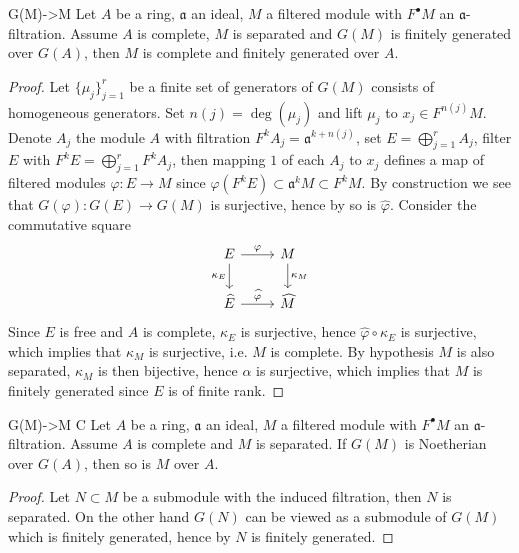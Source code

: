 \documentclass[10pt]{extarticle}
\begin{document}
\begin{proposition}{}{G(M)->M}
    Let $A$ be a ring, $\mathfrak{a}$ an ideal, $M$ a filtered module with $F^\bullet M$ an $\mathfrak{a}$-filtration. Assume $A$ is complete, $M$ is separated and $G(M)$ is finitely generated over $G(A)$, then $M$ is complete and finitely generated over $A$.
\end{proposition}
\begin{proof}
    Let $\{\mu_j\}_{j=1}^r$ be a finite set of generators of $G(M)$ consists of homogeneous generators. Set $n(j)=\deg(\mu_j)$ and lift $\mu_j$ to $x_j\in F^{n(j)}M$. Denote $A_j$ the module $A$ with filtration $F^kA_j=\mathfrak{a}^{k+n(j)}$, set $E=\bigoplus_{j=1}^r A_j$, filter $E$ with $F^kE=\bigoplus_{j=1}^r F^kA_j$, then mapping $1$ of each $A_j$ to $x_j$ defines a map of filtered modules $\varphi\colon E\to M$ since $\varphi(F^kE)\subset\mathfrak{a}^kM\subset F^kM$. By construction we see that $G(\varphi)\colon G(E)\to G(M)$ is surjective, hence by  so is $\widehat{\varphi}$. Consider the commutative square
    \[\begin{tikzcd}
	E & M \\
	{\widehat{E}} & {\widehat{M}}
	\arrow["\varphi", from=1-1, to=1-2]
	\arrow["{\kappa_E}"', from=1-1, to=2-1]
	\arrow["{\kappa_M}", from=1-2, to=2-2]
	\arrow["{\widehat{\varphi}}", from=2-1, to=2-2]
    \end{tikzcd}\]
    Since $E$ is free and $A$ is complete, $\kappa_E$ is surjective, hence $\widehat{\varphi}\circ\kappa_E$ is surjective, which implies that $\kappa_M$ is surjective, i.e. $M$ is complete. By hypothesis $M$ is also separated, $\kappa_M$ is then bijective, hence $\alpha$ is surjective, which implies that $M$ is finitely generated since $E$ is of finite rank. 
\end{proof}

\begin{corollary}{}{G(M)->M C}
    Let $A$ be a ring, $\mathfrak{a}$ an ideal, $M$ a filtered module with $F^\bullet M$ an $\mathfrak{a}$-filtration. Assume $A$ is complete and $M$ is separated. If $G(M)$ is Noetherian over $G(A)$, then so is $M$ over $A$.
\end{corollary}
\begin{proof}
    Let $N\subset M$ be a submodule with the induced filtration, then $N$ is separated. On the other hand $G(N)$ can be viewed as a submodule of $G(M)$ which is finitely generated, hence by  $N$ is finitely generated.
\end{proof}
\end{document}
